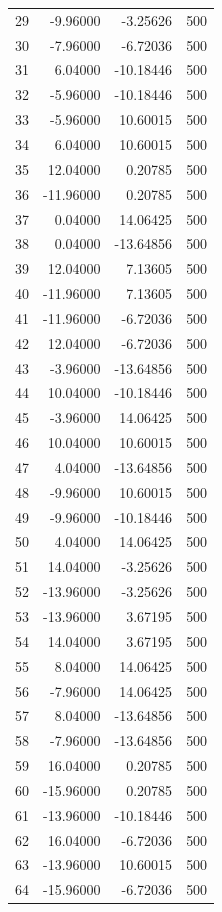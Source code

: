 \begin{longtable}{rrrr}
29 & -9.96000 & -3.25626 & 500 \\
30 & -7.96000 & -6.72036 & 500 \\
31 & 6.04000 & -10.18446 & 500 \\
32 & -5.96000 & -10.18446 & 500 \\
33 & -5.96000 & 10.60015 & 500 \\
34 & 6.04000 & 10.60015 & 500 \\
35 & 12.04000 & 0.20785 & 500 \\
36 & -11.96000 & 0.20785 & 500 \\
37 & 0.04000 & 14.06425 & 500 \\
38 & 0.04000 & -13.64856 & 500 \\
39 & 12.04000 & 7.13605 & 500 \\
40 & -11.96000 & 7.13605 & 500 \\
41 & -11.96000 & -6.72036 & 500 \\
42 & 12.04000 & -6.72036 & 500 \\
43 & -3.96000 & -13.64856 & 500 \\
44 & 10.04000 & -10.18446 & 500 \\
45 & -3.96000 & 14.06425 & 500 \\
46 & 10.04000 & 10.60015 & 500 \\
47 & 4.04000 & -13.64856 & 500 \\
48 & -9.96000 & 10.60015 & 500 \\
49 & -9.96000 & -10.18446 & 500 \\
50 & 4.04000 & 14.06425 & 500 \\
51 & 14.04000 & -3.25626 & 500 \\
52 & -13.96000 & -3.25626 & 500 \\
53 & -13.96000 & 3.67195 & 500 \\
54 & 14.04000 & 3.67195 & 500 \\
55 & 8.04000 & 14.06425 & 500 \\
56 & -7.96000 & 14.06425 & 500 \\
57 & 8.04000 & -13.64856 & 500 \\
58 & -7.96000 & -13.64856 & 500 \\
59 & 16.04000 & 0.20785 & 500 \\
60 & -15.96000 & 0.20785 & 500 \\
61 & -13.96000 & -10.18446 & 500 \\
62 & 16.04000 & -6.72036 & 500 \\
63 & -13.96000 & 10.60015 & 500 \\
64 & -15.96000 & -6.72036 & 500 \\

\end{longtable}
